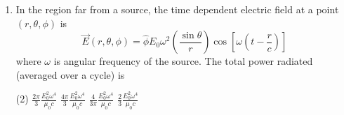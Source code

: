 \begin{enumerate}
	{}
	\begin{tasks}(2)
		\task[\textbf{a.}]$\frac{\mu_{0} e^{2} u^{2}}{3 \pi m c^{2} s}$
		\task[\textbf{b.}]$\frac{\mu_{0} e^{2} u^{2}}{6 \pi m c^{2} s}$
		\task[\textbf{c.}]$\frac{\mu_{0} e^{2} u}{8 \pi m c s}$
		\task[\textbf{d.}] $\frac{\mu_{0} e^{2} u}{16 \pi m c s}$
	\end{tasks}
\begin{answer}
	\begin{align*}
	\text{Total power radiated }P&=\frac{\mu_{0} q^{2} a^{2}}{6 \pi c}\\
	\text{Total energy radiated in time $t$ is }E&=P \cdot t=\frac{\mu_{0} e^{2} a^{2}}{6 \pi c} \cdot t=\frac{\mu_{0} e^{2} a^{2}}{6 \pi c} \times \frac{u}{2 a}\\
	&\left[\because v=u-a t \Rightarrow \frac{u}{2}=u-a t \Rightarrow t=\frac{u}{2 a}\right]\\
	\Rightarrow E&=\frac{\mu_{0} e^{2} a u}{12 \pi c}\\
	\text{Fraction of initial $K . E .$ lost due to radiation }&=\frac{E}{\frac{1}{2} m u^{2}}=\frac{2 E}{m u^{2}}\\
	&=\frac{2}{m u^{2}} \times \frac{\mu_{0} e^{2} a u}{12 \pi c}=\frac{\mu_{0} e^{2} a}{6 \pi m c u}
	\intertext{$\left[\therefore s=u t-\frac{1}{2} a t^{2}=u \times \frac{u}{2 a}-\frac{1}{2} a \times \frac{u^{2}}{4 a^{2}}=\frac{u^{2}}{2 a}-\frac{u^{2}}{8 a}=\frac{3 u^{2}}{8 a} \Rightarrow a=\frac{3 u^{2}}{8 s}\right]$}
	&=\frac{\mu_{0} e^{2}}{6 \pi m c u} \times \frac{3 u^{2}}{8 s}=\frac{\mu_{0} e^{2} u}{16 \pi m c s}
	\end{align*}
	So the correct answer is \textbf{Option (D)}
\end{answer}
	\item  In the region far from a source, the time dependent electric field at a point $(r, \theta, \phi)$ is
	$$
	\vec{E}(r, \theta, \phi)=\hat{\phi} E_{0} \omega^{2}\left(\frac{\sin \theta}{r}\right) \cos \left[\omega\left(t-\frac{r}{c}\right)\right]
	$$
	where $\omega$ is angular frequency of the source. The total power radiated (averaged over a cycle) is
	{}
	\begin{tasks}(2)
		\task[\textbf{a.}]$\frac{2 \pi}{3} \frac{E_{0}^{2} \omega^{4}}{\mu_{0} c}$
		\task[\textbf{b.}]$\frac{4 \pi}{3} \frac{E_{0}^{2} \omega^{4}}{\mu_{0} c}$
		\task[\textbf{c.}] $\frac{4}{3 \pi} \frac{E_{0}^{2} \omega^{4}}{\mu_{0} c}$
		\task[\textbf{d.}] $\frac{2}{3} \frac{E_{0}^{2} \omega^{4}}{\mu_{0} c}$
	\end{tasks}

\end{enumerate}
